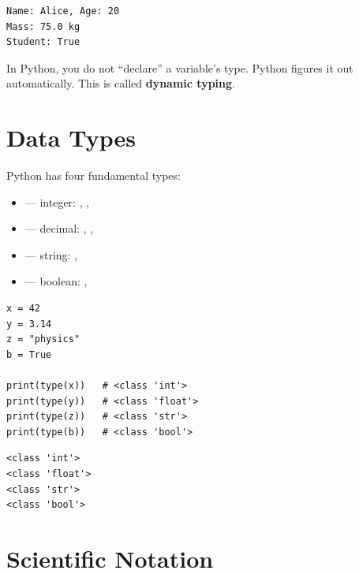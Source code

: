 \begin{codeoutput}
\begin{verbatim}
Name: Alice, Age: 20
Mass: 75.0 kg
Student: True
\end{verbatim}
\end{codeoutput}

\begin{warning}
In Python, you do not ``declare'' a variable's type. Python figures it out automatically. This is called \textbf{dynamic typing}.
\end{warning}

\section{Data Types}

\begin{definition}
Python has four fundamental types:
\begin{itemize}
\item {} --- integer: , , 
\item {} --- decimal: , , 
\item {} --- string: , 
\item {} --- boolean: , 
\end{itemize}
\end{definition}

\begin{codeblock}[title=\textbf{Python --- Checking types}]
\begin{verbatim}
x = 42
y = 3.14
z = "physics"
b = True

print(type(x))   # <class 'int'>
print(type(y))   # <class 'float'>
print(type(z))   # <class 'str'>
print(type(b))   # <class 'bool'>
\end{verbatim}
\end{codeblock}

\begin{codeoutput}
\begin{verbatim}
<class 'int'>
<class 'float'>
<class 'str'>
<class 'bool'>
\end{verbatim}
\end{codeoutput}

\section{Scientific Notation}

